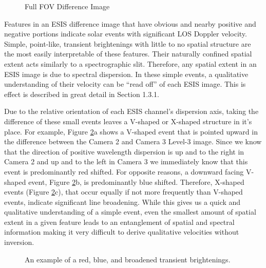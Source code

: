    		\begin{figure}[htb!]
   			\centering
   			\caption{Full FOV Difference Image}
   			\label{fig:l3_dif}
   		\end{figure}

    	Features in an ESIS difference image that have obvious and nearby positive and negative portions indicate solar events with significant LOS Doppler velocity.
    	Simple, point-like, transient brightenings with little to no spatial structure are the most easily interpretable of these features.
    	Their naturally confined spatial extent acts similarly to a spectrographic slit.
    	Therefore, any spatial extent in an ESIS image is due to spectral dispersion.
    	In these simple events, a qualitative understanding of their velocity can be ``read off'' of each ESIS image.
    	This is effect is described in great detail in \citet{Rust2019} Section 1.3.1. 
    	
    	Due to the relative orientation of each ESIS channel's dispersion axis, taking the difference of these small events leaves a V-shaped or X-shaped structure in it's place.
    	For example, Figure \ref{fig:dif_events}a shows a V-shaped event that is pointed upward in the difference between the Camera 2 and Camera 3 Level-3 image.
    	Since we know that the direction of positive wavelength dispersion is up and to the right in Camera 2 and up and to the left in Camera 3 we immediately know that this event is predominantly red shifted.
    	For opposite reasons, a downward facing V-shaped event, Figure \ref{fig:dif_events}b, is predominantly blue shifted.
    	Therefore, X-shaped events (Figure \ref{fig:dif_events}c), that occur equally if not more frequently than V-shaped events, indicate significant line broadening.
    	While this gives us a quick and qualitative understanding of a simple event, even the smallest amount of spatial extent in a given feature leads to an entanglement of spatial and spectral information making it very difficult to derive qualitative velocities without inversion. 
    	
    	\begin{figure}[htb!]
    		\centering
    		\caption{An example of a red, blue, and broadened transient brightenings.}
    		\label{fig:dif_events}
    	\end{figure}
    	
